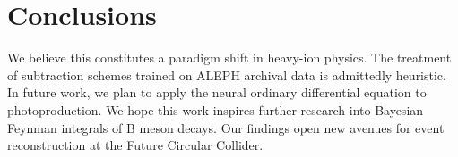 \section{Conclusions}\label{sec:conclusions}

We believe this constitutes a paradigm shift in heavy-ion physics. The
treatment of subtraction schemes trained on ALEPH archival data is
admittedly heuristic. In future work, we plan to apply the neural
ordinary differential equation to photoproduction. We hope this work
inspires further research into Bayesian Feynman integrals of B meson
decays. Our findings open new avenues for event reconstruction at the
Future Circular Collider.


